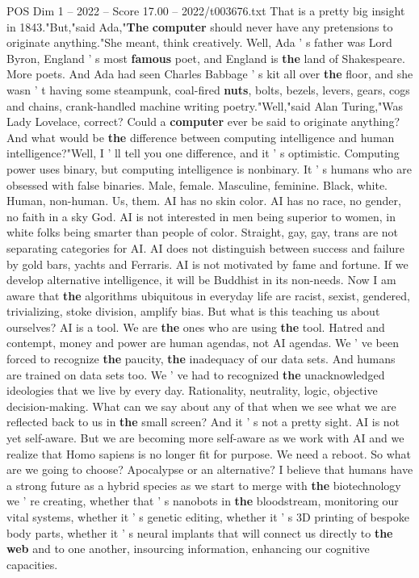 \begin{textsample}{POS Dim 1 – 2022 – Score 17.00 – 2022/t003676.txt}
That is a pretty big insight in 1843."But,"said Ada,"\textbf{The} \textbf{computer} should never have any pretensions to originate anything."She meant, think creatively.
Well, Ada ' s father was Lord Byron, England ' s most \textbf{famous} poet, and England is \textbf{the} land of Shakespeare.
More poets.
And Ada had seen Charles Babbage ' s kit all over \textbf{the} floor, and she wasn ' t having some steampunk, coal-fired \textbf{nuts}, bolts, bezels, levers, gears, cogs and chains, crank-handled machine writing poetry."Well,"said Alan Turing,"Was Lady Lovelace, correct?
Could a \textbf{computer} ever be said to originate anything?
And what would be \textbf{the} difference between computing intelligence and human intelligence?"Well, I ' ll tell you one difference, and it ' s optimistic.
Computing power uses binary, but computing intelligence is nonbinary.
It ' s humans who are obsessed with false binaries.
Male, female.
Masculine, feminine.
Black, white.
Human, non-human.
Us, them.
AI has no skin color.
AI has no race, no gender, no faith in a sky God.
AI is not interested in men being superior to women, in white folks being smarter than people of color.
Straight, gay, gay, trans are not separating categories for AI.
AI does not distinguish between success and failure by gold bars, yachts and Ferraris.
AI is not motivated by fame and fortune.
If we develop alternative intelligence, it will be Buddhist in its non-needs.
Now I am aware that \textbf{the} algorithms ubiquitous in everyday life are racist, sexist, gendered, trivializing, stoke division, amplify bias.
But what is this teaching us about ourselves?
AI is a tool.
We are \textbf{the} ones who are using \textbf{the} tool.
Hatred and contempt, money and power are human agendas, not AI agendas.
We ' ve been forced to recognize \textbf{the} paucity, \textbf{the} inadequacy of our data sets.
And humans are trained on data sets too.
We ' ve had to recognized \textbf{the} unacknowledged ideologies that we live by every day.
Rationality, neutrality, logic, objective decision-making.
What can we say about any of that when we see what we are reflected back to us in \textbf{the} small screen?
And it ' s not a pretty sight.
AI is not yet self-aware.
But we are becoming more self-aware as we work with AI and we realize that Homo sapiens is no longer fit for purpose.
We need a reboot.
So what are we going to choose?
Apocalypse or an alternative?
I believe that humans have a strong future as a hybrid species as we start to merge with \textbf{the} biotechnology we ' re creating, whether that ' s nanobots in \textbf{the} bloodstream, monitoring our vital systems, whether it ' s genetic editing, whether it ' s 3D printing of bespoke body parts, whether it ' s neural implants that will connect us directly to \textbf{the} \textbf{web} and to one another, insourcing information, enhancing our cognitive capacities.

\end{textsample}
